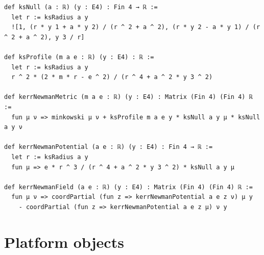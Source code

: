 \documentclass[11pt]{article}
\theoremstyle{definition}
\theoremstyle{remark}
\begin{document}
\begin{lstlisting}
def ksNull (a : ℝ) (y : E4) : Fin 4 → ℝ :=
  let r := ksRadius a y
  ![1, (r * y 1 + a * y 2) / (r ^ 2 + a ^ 2), (r * y 2 - a * y 1) / (r ^ 2 + a ^ 2), y 3 / r]

def ksProfile (m a e : ℝ) (y : E4) : ℝ :=
  let r := ksRadius a y
  r ^ 2 * (2 * m * r - e ^ 2) / (r ^ 4 + a ^ 2 * y 3 ^ 2)

def kerrNewmanMetric (m a e : ℝ) (y : E4) : Matrix (Fin 4) (Fin 4) ℝ :=
  fun μ ν => minkowski μ ν + ksProfile m a e y * ksNull a y μ * ksNull a y ν

def kerrNewmanPotential (a e : ℝ) (y : E4) : Fin 4 → ℝ :=
  let r := ksRadius a y
  fun μ => e * r ^ 3 / (r ^ 4 + a ^ 2 * y 3 ^ 2) * ksNull a y μ

def kerrNewmanField (a e : ℝ) (y : E4) : Matrix (Fin 4) (Fin 4) ℝ :=
  fun μ ν => coordPartial (fun z => kerrNewmanPotential a e z ν) μ y
    - coordPartial (fun z => kerrNewmanPotential a e z μ) ν y
\end{lstlisting}

\section{Platform objects}\label{app:ids}
\end{document}
